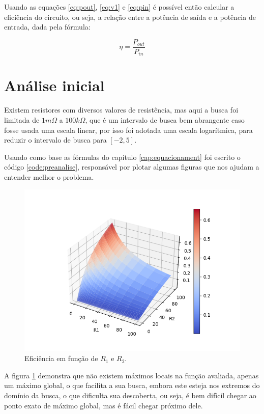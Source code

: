 \documentclass[12pt]{article}
\begin{document}
Usando as equações \ref{eq:pout}, \ref{eq:v1} e \ref{eq:pin} é possível então calcular a eficiência do circuito, ou seja, a relação entre a potência de saída e a potência de entrada, dada pela fórmula:

\begin{equation}
    \label{eq:n}
    \eta = \frac{P_{out}}{P_{in}}
\end{equation}

\section{Análise inicial}

Existem resistores com diversos valores de resistência, mas aqui a busca foi limitada de $1m\Omega$ a $100k\Omega$, que é um intervalo de busca bem abrangente caso fosse usada uma escala linear, por isso foi adotada uma escala logarítmica, para reduzir o intervalo de busca para $\left[-2,5\right]$.



Usando como base as fórmulas do capítulo \ref{cap:equacionament} foi escrito o código \ref{code:preanalise}, responsável por plotar algumas figuras que nos ajudam a entender melhor o problema.

\begin{figure}
    \centering
    \includegraphics{fig/surface.png}
    \caption{Eficiência em função de $R_1$ e $R_2$.}
    \label{fig:ef}
\end{figure}

A figura \ref{fig:ef} demonstra que não existem máximos locais na função avaliada, apenas um máximo global, o que facilita a sua busca, embora este esteja nos extremos do domínio da busca, o que dificulta sua descoberta, ou seja, é bem difícil chegar ao ponto exato de máximo global, mas é fácil chegar próximo dele.
\end{document}
